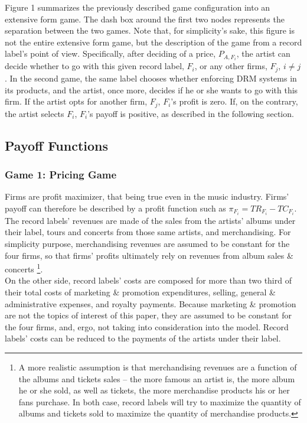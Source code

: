 \documentclass[letter,12pt]{article}
\numberwithin{equation}{section}
\begin{document}
Figure 1 summarizes the previously described game configuration into an extensive form game. The dash box around the first two nodes represents the separation between the two games. Note that, for simplicity's sake, this figure is not the entire extensive form game, but the description of the game from a record label's point of view. Specifically, after deciding of a price, $P_{A, F_i}$, the artist can decide whether to go with this given record label, $F_i$, or any other firms, $F_j$, $i \ne j$. In the second game, the same label chooses whether enforcing DRM systems in its products, and the artist, once more, decides if he or she wants to go with this firm. If the artist opts for another firm, $F_j$, $F_i$'s profit is zero. If, on the contrary, the artist selects $F_i$, $F_i$'s payoff is positive, as described in the following section.

\subsection{Payoff Functions}

\subsubsection{Game 1: Pricing Game}

Firms are profit maximizer, that being true even in the music industry. Firms' payoff can therefore be described by a profit function such as $\pi_{F_i} = TR_{F_i} - TC_{F_i}$.\\

The record labels' revenues are made of the sales from the artists' albums under their label, tours and concerts from those same artists, and merchandising. For simplicity purpose, merchandising revenues are assumed to be constant for the four firms, so that firms' profits ultimately rely on revenues from album sales \& concerts \footnote{
A more realistic assumption is that merchandising revenues are a function of the albums and tickets sales – the more famous an artist is, the more album he or she sold, as well as tickets, the more merchandise products his or her fans purchase. In both case, record labels will try to maximize the quantity of albums and tickets sold to maximize the quantity of merchandise products.
}.\\

On the other side, record labels' costs are composed for more than two third of their total costs of marketing \& promotion expenditures, selling, general \& administrative expenses, and royalty payments. Because marketing \& promotion are not the topics of interest of this paper, they are assumed to be constant for the four firms, and, ergo, not taking into consideration into the model. Record labels' costs can be reduced to the payments of the artists under their label.\\
\end{document}
